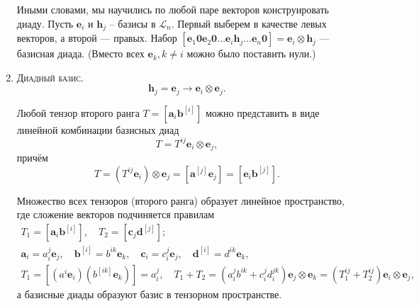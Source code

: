 \begin{definition}[геометрическое]
\begin{enumerate}
		Иными словами, мы научились по любой паре векторов конструировать диаду. Пусть $\mathbf{e}_i$ и
		$\mathbf{h}_j$ -- базисы в $\mathcal{L}_n$. Первый выберем в качестве левых векторов, а
		второй --- правых. Набор $[\mathbf{e}_1 \mathbf{0} \mathbf{e}_2 \mathbf{0}
		\dots \mathbf{e}_i \mathbf{h}_j \dots \mathbf{e}_n \mathbf{0}] =
		\mathbf{e}_i \otimes \mathbf{h}_j$ --- базисная диада. (Вместо всех
		$\mathbf{e}_k, k\neq i$ можно было поставить нули.) 
		
		\item \textsc{Диадный базис.}
		\begin{equation*}
			\mathbf{h}_j = \mathbf{e}_j \longrightarrow \mathbf{e}_i \otimes
			\mathbf{e}_j.
		\end{equation*}
		
		\begin{theorem}
			Любой тензор второго ранга $ T = [\mathbf{a}_i \mathbf{b}^{[i]}]$ можно представить в виде линейной комбинации базисных диад
			\begin{equation}\label{lec_2:eq:tensor_basis}
				T = T^{ij} \mathbf{e}_i \otimes \mathbf{e}_j,
			\end{equation}
			причём
			\[
			T = (T^{ij} \mathbf{e}_i) \otimes \mathbf{e}_j
			= [\mathbf{a}^{[j]} \mathbf{e}_j]
			= [\mathbf{e}_i \mathbf{b}^{[j]}].
			\]
		\end{theorem}
		\begin{corollary*}
			Множество всех тензоров (второго ранга) образует линейное пространство,
			где сложение векторов подчиняется правилам
			\begin{gather*}
				T_1 = [\mathbf{a}_i \mathbf{b}^{[i]}], \quad
				T_2 = [\mathbf{c}_j \mathbf{d}^{[j]}]; \\
				\mathbf{a}_i = a^j_i \mathbf{e}_j, \quad
				\mathbf{b}^{[i]} = b^{ik} \mathbf{e}_k,\quad
				\mathbf{c}_i = c^{j}_{i} \mathbf{e}_j, \quad
				\mathbf{d}^{[i]} = d^{ik} \mathbf{e}_k,  \\
				T_1 = [(a^i \mathbf{e}_i) (b^{[ik]} \mathbf{e}_k)] = a^j_i, \quad
				T_1 + T_2 = (a^j_i b^{ik} + c^{j}_i d^{jk}_i) \mathbf{e}_j \otimes \mathbf{e}_k
				= (T_1^{ij} + T_2^{ij}) \mathbf{e}_i \otimes \mathbf{e}_j,
			\end{gather*}
			а базисные диады образуют базис в тензорном пространстве.
		\end{corollary*}
	\end{enumerate}
\end{definition}

